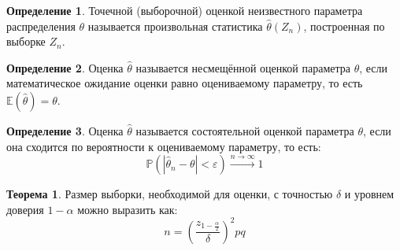 \documentclass[12pt]{article}
\theoremstyle{definition}
\newtheorem{theorem}{Теорема}[section]
\newtheorem{definition}{Определение}
\newcommand{\E}{\mathbb{E}}
\newcommand{\prob}{\mathbb{P}}
\begin{document}
\begin{definition}
    Точечной (выборочной) оценкой неизвестного параметра распределения $\theta$ называется произвольная статистика $\hat{\theta}(Z_n)$, построенная по выборке $Z_n$.
\end{definition}
\begin{definition}
    Оценка $\hat{\theta}$ называется несмещённой оценкой параметра $\theta$, если математическое ожидание оценки равно оцениваемому параметру, то есть $\E(\hat{\theta})=\theta$.
\end{definition}
\begin{definition}
    Оценка $\hat{\theta}$ называется состоятельной оценкой параметра $\theta$, если она сходится по вероятности к оцениваемому параметру, то есть:
    $$\prob(|\hat{\theta}_n-\theta|<\varepsilon)\xrightarrow{n\to\infty}1$$
\end{definition}
\begin{theorem}
    Размер выборки, необходимой для оценки, с точностью $\delta$ и уровнем доверия $1-\alpha$ можно выразить как:
    $$n=\left(\frac{z_{1-\frac{\alpha}{2}}}{\delta}\right)^2pq$$
\end{theorem}
\end{document}
